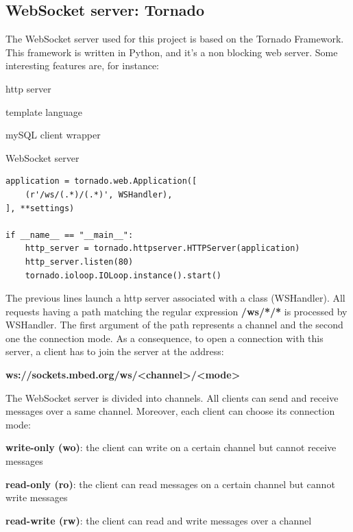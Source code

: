\documentclass[pdftex,10pt,a4paper]{report}
\newenvironment{packed_item}{
\begin{itemize}
  \setlength{\itemsep}{1pt}
  \setlength{\parskip}{0pt}
  \setlength{\parsep}{0pt}
}{\end{itemize}}
\begin{document}
\subsection{WebSocket server: Tornado}
The WebSocket server used for this project is based on the Tornado Framework. This framework is written in Python, and it's a non blocking web server. Some interesting features are, for instance:
\begin{packed_item}
	\item http server
	\item template language
	\item mySQL client wrapper
	\item WebSocket server
\end{packed_item}

\begin{lstlisting}[label=Launching of an HTTP server with Tornado,caption=Launching of an HTTP server with Tornado]
application = tornado.web.Application([
    (r'/ws/(.*)/(.*)', WSHandler),
], **settings)

if __name__ == "__main__":
    http_server = tornado.httpserver.HTTPServer(application)
    http_server.listen(80)
    tornado.ioloop.IOLoop.instance().start()
\end{lstlisting}

The previous lines launch a http server associated with a class (WSHandler). All requests having a path matching the regular expression \textbf{/ws/*/*} is processed by WSHandler. The first argument of the path represents a channel and the second one the connection mode. As a consequence, to open a connection with this server, a client has to join the server at the address: 
\begin{center}
\textbf{ws://sockets.mbed.org/ws/\textless{}channel\textgreater{}/\textless{}mode\textgreater{}}
\end{center}

The WebSocket server is divided into channels. All clients can send and receive messages over a same channel. Moreover, each client can choose its connection mode:

\begin{packed_item}
	\item \textbf{write-only (wo)}: the client can write on a certain channel but cannot receive messages
	\item \textbf{read-only (ro)}: the client can read messages on a certain channel but cannot write messages
	\item \textbf{read-write (rw)}: the client can read and write messages over a channel
\end{packed_item}
\end{document}
